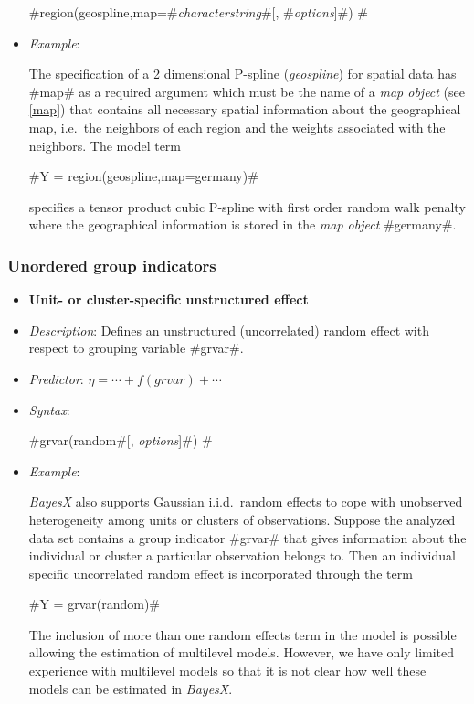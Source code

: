 \begin{itemize}
#region(geospline,map=#{\em characterstring}#[, #{\em options}]#) #
\item[] {\em Example}:

The specification of a 2 dimensional P-spline ({\em geospline})
for spatial data has #map# as a required argument which must be
the name of a {\em map object} (see \autoref{map}) that contains
all necessary spatial information about the geographical map,
i.e.~the neighbors of each region and the weights associated with
the neighbors. The model term

#Y = region(geospline,map=germany)#

specifies a tensor product cubic P-spline with first order random
walk penalty where the geographical information is stored in the
{\em map object} #germany#.
\end{itemize}

\subsubsection*{Unordered group indicators}

\begin{itemize}
\item[]{\bf\sffamily Unit- or cluster-specific unstructured
effect}

\item[] {\em Description}: Defines an unstructured (uncorrelated)
random effect with respect to grouping variable #grvar#. \item[]
{\em Predictor}: $\eta = \cdots + f(grvar) + \cdots$ \item[] {\em
Syntax}:

#grvar(random#[, {\em options}]#) #
\item[] {\em Example}:

{\em BayesX} also supports Gaussian i.i.d.~random effects to cope
with unobserved heterogeneity among units or clusters of
observations. Suppose the analyzed data set contains a group
indicator #grvar# that gives information about the individual or
cluster a particular observation belongs to. Then an individual
specific uncorrelated random effect is incorporated through the
term

#Y = grvar(random)#

The inclusion of more than one random effects term in the model is
possible allowing the estimation of multilevel models. However, we
have only limited experience with multilevel models so that it is
not clear how well these models can be estimated in {\em BayesX}.
\end{itemize}

